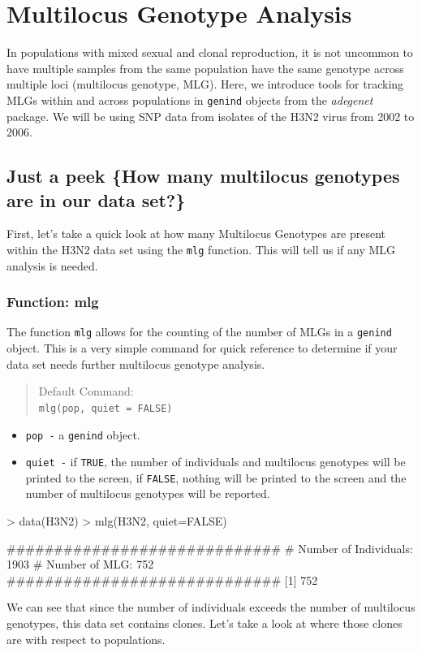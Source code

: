 \documentclass[letterpaper]{article}
\newcommand{\tab}{\hspace*{1em}}
\begin{document}
\section{Multilocus Genotype Analysis}

\tab\tab In populations with mixed sexual and clonal reproduction, it is not uncommon to have multiple samples from the same population have the same genotype across multiple loci (multilocus genotype, MLG). Here, we introduce tools for tracking MLGs within and across populations in \texttt{genind} objects from the \textit{adegenet} package. We will be using SNP data from isolates of the H3N2 virus from 2002 to 2006.
\subsection{Just a peek \{How many multilocus genotypes are in our data set?\}}

\tab\tab First, let's take a quick look at how many Multilocus Genotypes are present within the H3N2 data set using the \texttt{mlg} function. This will tell us if any MLG analysis is needed.
\subsubsection{Function: mlg}

\tab\tab The function \texttt{mlg} allows for the counting of the number of MLGs in a \texttt{genind} object. This is a very simple command for quick reference to determine if your data set needs further multilocus genotype analysis.
\begin{quote}
Default Command:\\
\texttt{mlg(pop, quiet = FALSE)}
\end{quote}
  \begin{itemize}
    \item \texttt{pop -} a \texttt{genind} object.
    \item \texttt{quiet -} if \texttt{TRUE}, the number of individuals and multilocus genotypes will be printed to the screen, if \texttt{FALSE}, nothing will be printed to the screen and the number of multilocus genotypes will be reported.
  \end{itemize}
\begin{Schunk}
\begin{Sinput}
> data(H3N2)
> mlg(H3N2, quiet=FALSE)
\end{Sinput}
\begin{Soutput}
#############################
# Number of Individuals: 1903 
# Number of MLG: 752 
#############################
[1] 752
\end{Soutput}
\end{Schunk}
We can see that since the number of individuals exceeds the number of multilocus genotypes, this data set contains clones. Let's take a look at where those clones are with respect to populations.
\end{document}
